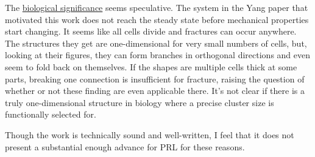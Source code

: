 \documentclass[12pt,oneside,letterpaper]{article}
\begin{document}
The \underline{biological significance} seems speculative. The system in the Yang paper that motivated this work does not reach the steady state before mechanical properties start changing. It seems like all cells divide and fractures can occur anywhere. The structures they get are one-dimensional for very small numbers of cells, but, looking at their figures, they can form branches in orthogonal directions and even seem to fold back on themselves. If the shapes are multiple cells thick at some parts, breaking one connection is insufficient for fracture, raising the question of whether or not these finding are even applicable there. It's not clear if there is a truly one-dimensional structure in biology where a precise cluster size is functionally selected for.

Though the work is technically sound and well-written, I feel that it does not present a substantial enough advance for PRL for these reasons.
\end{document}
